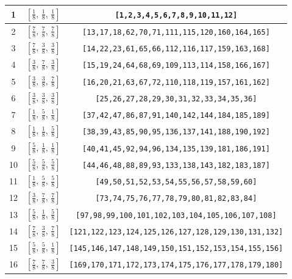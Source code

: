 \documentclass[fleqn,8pt]{jsarticle}
\begin{document}
\begin{longtable}{ccc}
1 & $\left[ \frac{1}{8},\, \frac{1}{8},\, \frac{1}{8} \right]$ & {\tt [1,2,3,4,5,6,7,8,9,10,11,12]} \\ \hline
2 & $\left[ \frac{7}{8},\, \frac{7}{8},\, \frac{7}{8} \right]$ & {\tt [13,17,18,62,70,71,111,115,120,160,164,165]} \\ \hline
3 & $\left[ \frac{7}{8},\, \frac{3}{8},\, \frac{3}{8} \right]$ & {\tt [14,22,23,61,65,66,112,116,117,159,163,168]} \\ \hline
4 & $\left[ \frac{3}{8},\, \frac{7}{8},\, \frac{3}{8} \right]$ & {\tt [15,19,24,64,68,69,109,113,114,158,166,167]} \\ \hline
5 & $\left[ \frac{3}{8},\, \frac{3}{8},\, \frac{7}{8} \right]$ & {\tt [16,20,21,63,67,72,110,118,119,157,161,162]} \\ \hline
6 & $\left[ \frac{3}{8},\, \frac{3}{8},\, \frac{3}{8} \right]$ & {\tt [25,26,27,28,29,30,31,32,33,34,35,36]} \\ \hline
7 & $\left[ \frac{1}{8},\, \frac{5}{8},\, \frac{1}{8} \right]$ & {\tt [37,42,47,86,87,91,140,142,144,184,185,189]} \\ \hline
8 & $\left[ \frac{1}{8},\, \frac{1}{8},\, \frac{5}{8} \right]$ & {\tt [38,39,43,85,90,95,136,137,141,188,190,192]} \\ \hline
9 & $\left[ \frac{5}{8},\, \frac{1}{8},\, \frac{1}{8} \right]$ & {\tt [40,41,45,92,94,96,134,135,139,181,186,191]} \\ \hline
10 & $\left[ \frac{5}{8},\, \frac{5}{8},\, \frac{5}{8} \right]$ & {\tt [44,46,48,88,89,93,133,138,143,182,183,187]} \\ \hline
11 & $\left[ \frac{1}{8},\, \frac{5}{8},\, \frac{5}{8} \right]$ & {\tt [49,50,51,52,53,54,55,56,57,58,59,60]} \\ \hline
12 & $\left[ \frac{3}{8},\, \frac{7}{8},\, \frac{7}{8} \right]$ & {\tt [73,74,75,76,77,78,79,80,81,82,83,84]} \\ \hline
13 & $\left[ \frac{5}{8},\, \frac{1}{8},\, \frac{5}{8} \right]$ & {\tt [97,98,99,100,101,102,103,104,105,106,107,108]} \\ \hline
14 & $\left[ \frac{7}{8},\, \frac{3}{8},\, \frac{7}{8} \right]$ & {\tt [121,122,123,124,125,126,127,128,129,130,131,132]} \\ \hline
15 & $\left[ \frac{5}{8},\, \frac{5}{8},\, \frac{1}{8} \right]$ & {\tt [145,146,147,148,149,150,151,152,153,154,155,156]} \\ \hline
16 & $\left[ \frac{7}{8},\, \frac{7}{8},\, \frac{3}{8} \right]$ & {\tt [169,170,171,172,173,174,175,176,177,178,179,180]} \\
\end{longtable}
\end{document}
